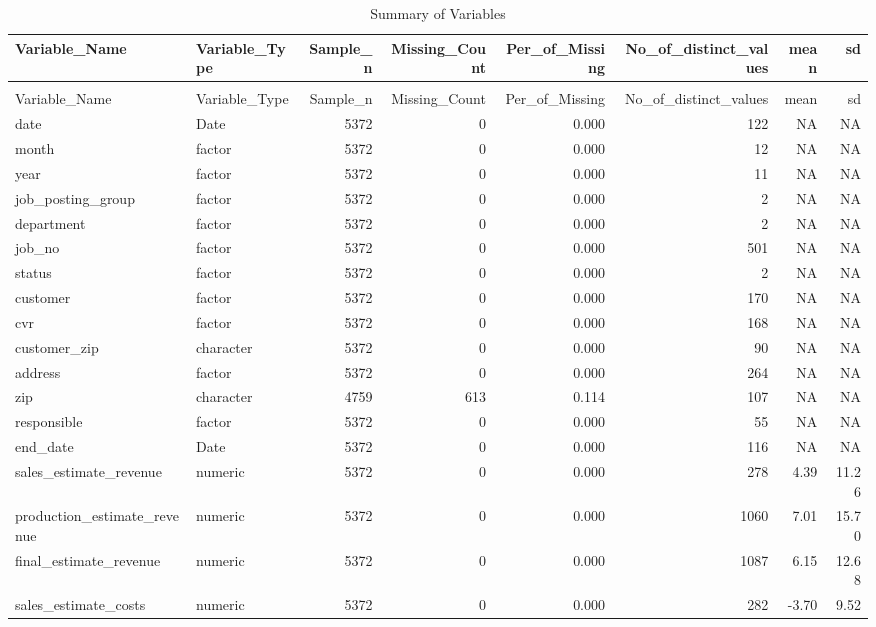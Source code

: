\begingroup\fontsize{9}{11}\selectfont

\begin{landscape}
\begin{longtable}[t]{llrrrrrr}
\caption{Summary of Variables}\\
\toprule
Variable\_Name & Variable\_Type & Sample\_n & Missing\_Count & Per\_of\_Missing & No\_of\_distinct\_values & mean & sd\\
\midrule
\endfirsthead
\caption[]{Summary of Variables }\\
\toprule
Variable\_Name & Variable\_Type & Sample\_n & Missing\_Count & Per\_of\_Missing & No\_of\_distinct\_values & mean & sd\\
\midrule
\endhead

\endfoot
\bottomrule
\endlastfoot
date & Date & 5372 & 0 & 0.000 & 122 & NA & NA\\
month & factor & 5372 & 0 & 0.000 & 12 & NA & NA\\
year & factor & 5372 & 0 & 0.000 & 11 & NA & NA\\
job\_posting\_group & factor & 5372 & 0 & 0.000 & 2 & NA & NA\\
department & factor & 5372 & 0 & 0.000 & 2 & NA & NA\\
job\_no & factor & 5372 & 0 & 0.000 & 501 & NA & NA\\
status & factor & 5372 & 0 & 0.000 & 2 & NA & NA\\
customer & factor & 5372 & 0 & 0.000 & 170 & NA & NA\\
cvr & factor & 5372 & 0 & 0.000 & 168 & NA & NA\\
customer\_zip & character & 5372 & 0 & 0.000 & 90 & NA & NA\\
address & factor & 5372 & 0 & 0.000 & 264 & NA & NA\\
zip & character & 4759 & 613 & 0.114 & 107 & NA & NA\\
responsible & factor & 5372 & 0 & 0.000 & 55 & NA & NA\\
end\_date & Date & 5372 & 0 & 0.000 & 116 & NA & NA\\
sales\_estimate\_revenue & numeric & 5372 & 0 & 0.000 & 278 & 4.39 & 11.26\\
production\_estimate\_revenue & numeric & 5372 & 0 & 0.000 & 1060 & 7.01 & 15.70\\
final\_estimate\_revenue & numeric & 5372 & 0 & 0.000 & 1087 & 6.15 & 12.68\\
sales\_estimate\_costs & numeric & 5372 & 0 & 0.000 & 282 & -3.70 & 9.52\\

\end{longtable}
\end{landscape}
